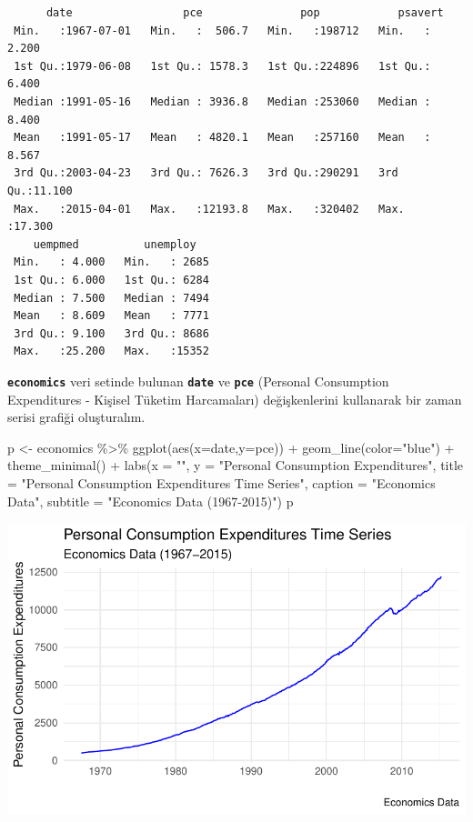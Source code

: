 \documentclass[
  letterpaper,
  DIV=11,
  numbers=noendperiod]{scrreprt}
\newenvironment{Shaded}{\begin{snugshade}}{\end{snugshade}}
\newcommand{\AttributeTok}[1]{\textcolor[rgb]{0.40,0.45,0.13}{#1}}
\newcommand{\FunctionTok}[1]{\textcolor[rgb]{0.28,0.35,0.67}{#1}}
\newcommand{\NormalTok}[1]{\textcolor[rgb]{0.00,0.23,0.31}{#1}}
\newcommand{\OtherTok}[1]{\textcolor[rgb]{0.00,0.23,0.31}{#1}}
\newcommand{\SpecialCharTok}[1]{\textcolor[rgb]{0.37,0.37,0.37}{#1}}
\newcommand{\StringTok}[1]{\textcolor[rgb]{0.13,0.47,0.30}{#1}}
\begin{document}
\begin{verbatim}
      date                 pce               pop            psavert      
 Min.   :1967-07-01   Min.   :  506.7   Min.   :198712   Min.   : 2.200  
 1st Qu.:1979-06-08   1st Qu.: 1578.3   1st Qu.:224896   1st Qu.: 6.400  
 Median :1991-05-16   Median : 3936.8   Median :253060   Median : 8.400  
 Mean   :1991-05-17   Mean   : 4820.1   Mean   :257160   Mean   : 8.567  
 3rd Qu.:2003-04-23   3rd Qu.: 7626.3   3rd Qu.:290291   3rd Qu.:11.100  
 Max.   :2015-04-01   Max.   :12193.8   Max.   :320402   Max.   :17.300  
    uempmed          unemploy    
 Min.   : 4.000   Min.   : 2685  
 1st Qu.: 6.000   1st Qu.: 6284  
 Median : 7.500   Median : 7494  
 Mean   : 8.609   Mean   : 7771  
 3rd Qu.: 9.100   3rd Qu.: 8686  
 Max.   :25.200   Max.   :15352  
\end{verbatim}

\textbf{\texttt{economics}} veri setinde bulunan \textbf{\texttt{date}}
ve \textbf{\texttt{pce}} (Personal Consumption Expenditures - Kişisel
Tüketim Harcamaları) değişkenlerini kullanarak bir zaman serisi grafiği
oluşturalım.

\begin{Shaded}
\begin{Highlighting}[]
\NormalTok{p }\OtherTok{\textless{}{-}}\NormalTok{ economics }\SpecialCharTok{\%\textgreater{}\%} 
  \FunctionTok{ggplot}\NormalTok{(}\FunctionTok{aes}\NormalTok{(}\AttributeTok{x=}\NormalTok{date,}\AttributeTok{y=}\NormalTok{pce)) }\SpecialCharTok{+}
  \FunctionTok{geom\_line}\NormalTok{(}\AttributeTok{color=}\StringTok{"blue"}\NormalTok{) }\SpecialCharTok{+}
  \FunctionTok{theme\_minimal}\NormalTok{() }\SpecialCharTok{+}
  \FunctionTok{labs}\NormalTok{(}\AttributeTok{x =} \StringTok{""}\NormalTok{,}
       \AttributeTok{y =} \StringTok{"Personal Consumption Expenditures"}\NormalTok{,}
       \AttributeTok{title =} \StringTok{"Personal Consumption Expenditures Time Series"}\NormalTok{,}
       \AttributeTok{caption =} \StringTok{"Economics Data"}\NormalTok{,}
       \AttributeTok{subtitle =} \StringTok{"Economics Data (1967{-}2015)"}\NormalTok{)}
\NormalTok{p}
\end{Highlighting}
\end{Shaded}

\includegraphics{ggplot2_files/figure-pdf/unnamed-chunk-20-1.pdf}
\end{document}
